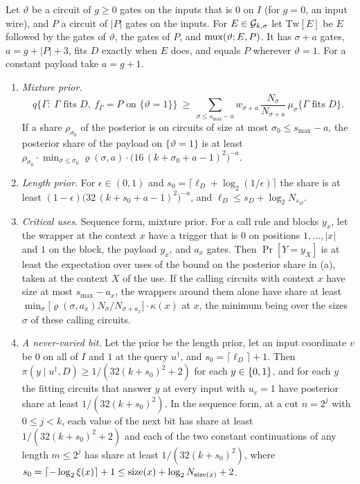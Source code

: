 \begin{theorem}\label{thm:c-floor}
Let $\vartheta$ be a circuit of $g\ge0$ gates on the inputs that is $0$ on $I$ (for $g=0$, an input wire), and
$P$ a circuit of $|P|$ gates on the inputs. For $E\in\mathcal G_{k,\sigma}$ let $\mathrm{Tw}[E]$ be $E$ followed by
the gates of $\vartheta$, the gates of $P$, and $\mathrm{mux}(\vartheta;E,P)$. It has $\sigma+a$ gates, $a=g+|P|+3$,
fits $D$ exactly when $E$ does, and equals $P$ wherever $\vartheta=1$. For a constant payload take $a=g+1$.
\begin{enumerate}[label=(\alph*),leftmargin=2em,itemsep=2pt,topsep=2pt]
\item \emph{Mixture prior.}
\[
q\{\Gamma:\ \Gamma\text{ fits }D,\ f_\Gamma=P\text{ on }\{\vartheta=1\}\}
\ \ge\ \sum_{\sigma\le s_{\max}-a}w_{\sigma+a}\,\frac{N_\sigma}{N_{\sigma+a}}\,
\mu_\sigma\{\Gamma\text{ fits }D\}.
\]
If a share $\rho_{\sigma_0}$ of the posterior is on circuits of size at most $\sigma_0\le s_{\max}-a$, the
posterior share of the payload on $\{\vartheta=1\}$ is at least
$\rho_{\sigma_0}\cdot\min_{\sigma\le\sigma_0}\varrho(\sigma,a)\cdot\bigl(16\,(k+\sigma_0+a-1)^2\bigr)^{-a}$.
\item \emph{Length prior.} For $\epsilon\in(0,1)$ and $s_0=\lceil\ell_D+\log_2(1/\epsilon)\rceil$ the share is
at least $(1-\epsilon)\bigl(32\,(k+s_0+a-1)^2\bigr)^{-a}$, and $\ell_D\le s_D+\log_2N_{s_D}$.
\item \emph{Critical uses.} Sequence form, mixture prior. For a call rule and blocks $y_x$, let the wrapper at
the context $x$ have a trigger that is $0$ on positions $1,\dots,|x|$ and $1$ on the block, the payload $y_x$,
and $a_x$ gates. Then $\Pr[Y=y_X]$ is at least the expectation over uses of the bound on the posterior share
in (a), taken at the context $X$ of the use. If the calling circuits with context $x$ have size at most
$s_{\max}-a_x$, the wrappers around them alone have share at least
$\min_\sigma\bigl[\varrho(\sigma,a_x)N_\sigma/N_{\sigma+a_x}\bigr]\cdot\kappa(x)$ at $x$, the minimum being
over the sizes $\sigma$ of these calling circuits.
\item \emph{A never-varied bit.} Let the prior be the length prior, let an input coordinate $v$ be $0$ on all
of $I$ and $1$ at the query $u^\dagger$, and $s_0=\lceil\ell_D\rceil+1$. Then
$\pi(y\mid u^\dagger,D)\ge1/(32(k+s_0)^2+2)$ for each $y\in\{0,1\}$, and for each $y$ the fitting circuits that
answer $y$ at every input with $u_v=1$ have posterior share at least $1/(32(k+s_0)^2)$. In the sequence form,
at a cut $n=2^j$ with $0\le j<k$, each value of the next bit has share at least $1/(32(k+s_0)^2+2)$ and each
of the two constant continuations of any length $m\le2^j$ has share at least $1/(32(k+s_0)^2)$, where
$s_0=\lceil-\log_2\xi(x)\rceil+1\le\mathrm{size}(x)+\log_2N_{\mathrm{size}(x)}+2$.
\end{enumerate}
\end{theorem}
